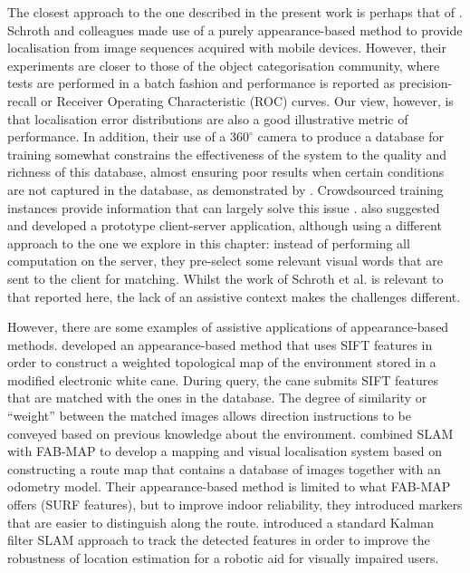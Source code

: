 The closest approach to the one described in the present work is perhaps that of \citet{schroth2011mobile}. Schroth and colleagues made use of a purely appearance-based method to provide localisation from image sequences acquired with mobile devices.  However, their experiments are closer to those of the object categorisation community, where tests are performed in a batch fashion and performance is reported as precision-recall or Receiver  Operating Characteristic (ROC) curves. Our view, however, is that localisation error distributions are also a good illustrative metric of performance.  In addition, their use of a $360^{\circ}$ camera to produce a database for training somewhat constrains the effectiveness of the system to the quality and richness of this database, almost ensuring poor results when certain conditions are not captured in the database, as demonstrated by \citet{milford2012seqslam}. Crowdsourced training instances provide information that can largely solve this issue \citep{RiveraWearable}. \citet{schroth2011mobile} also suggested and developed a prototype client-server application, although using a different approach to the one we explore in this chapter: instead of performing all computation on the server, they pre-select some relevant visual words that are sent to the client for matching. Whilst the work of Schroth et al. is relevant to that reported here, the lack of an assistive context makes the challenges different.

However, there are some examples of assistive applications of appearance-based methods. \citet{ali2010indoor} developed an appearance-based method that uses SIFT features in order to construct a weighted topological map of the environment stored in a modified electronic white cane. During query, the cane submits SIFT features that are matched with the ones in the database. The degree of similarity or ``weight'' between the matched images allows direction instructions to be conveyed based on previous knowledge about the environment. \citet{nguyen2014mapping} combined SLAM with FAB-MAP to develop a mapping and visual localisation system based on constructing a route map that contains a database of images together with an odometry model. Their appearance-based method is limited to what FAB-MAP offers (SURF features), but to improve indoor reliability, they introduced markers that are easier to distinguish along the route. \citet{nguyen2014visual} introduced a standard Kalman filter SLAM approach to track the detected features in order to improve the robustness of location estimation for a robotic aid for visually impaired users.


